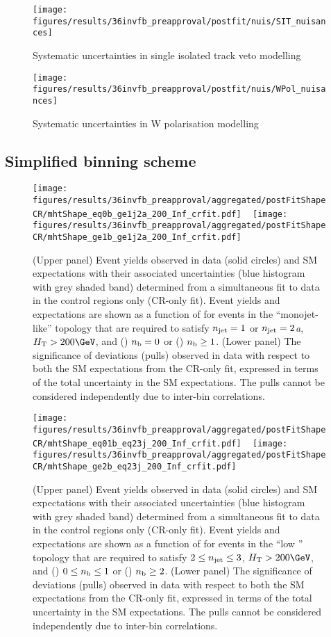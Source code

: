 \clearpage
\begin{figure}[h!]
  \centering
  \caption{Systematic uncertainties in single isolated track veto modelling}
  \texttt{[image: figures/results/36invfb\_preapproval/postfit/nuis/SIT\_nuisances]}
\end{figure}

\clearpage
\begin{figure}[h!]
  \centering
  \caption{Systematic uncertainties in W polarisation modelling}
  \texttt{[image: figures/results/36invfb\_preapproval/postfit/nuis/WPol\_nuisances]}
\end{figure}

\clearpage
\subsection{Simplified binning scheme}
\label{app:aggregated}

\newcommand{\customcaption}[5]{(Upper panel) Event yields observed in
  data (solid circles) and SM expectations with their associated
  uncertainties (blue histogram with grey shaded band) determined from
  a simultaneous fit to data in the control regions only (CR-only
  fit). Event yields and expectations are shown as a function of
  \HTmiss for events in the #1 topology that are required to satisfy
  #2, #3, and (\cmsLeft) #4 or (\cmsRight) #5. 
  (Lower panel) The significance of deviations (pulls) observed in
  data with respect to both the SM expectations from the CR-only fit,
  expressed in terms of the total uncertainty in the SM
  expectations. The pulls cannot be considered independently due to
  inter-bin correlations.}

\begin{figure}[h!]
  \centering
  \caption{
    \customcaption{``monojet-like''}{$n_{\text{jet}} = 1$ or $n_{\text{jet}} = 2${\it a}}{$\scalht > 200\GeV$}{$n_{\text{b}} = 0$}{$n_{\text{b}} \geq 1$}
  }
  \texttt{[image: figures/results/36invfb\_preapproval/aggregated/postFitShapeCR/mhtShape\_eq0b\_ge1j2a\_200\_Inf\_crfit.pdf]} ~
  \texttt{[image: figures/results/36invfb\_preapproval/aggregated/postFitShapeCR/mhtShape\_ge1b\_ge1j2a\_200\_Inf\_crfit.pdf]} 
  \label{fig:aggregated_results1}
\end{figure}

\begin{figure}[h!]
  \centering
  \caption{
    \customcaption{``low \njet''}{$2 \leq n_{\text{jet}} \leq 3$}{$\scalht > 200\GeV$}{$0 \leq n_{\text{b}} \leq 1$}{$n_{\text{b}} \geq 2$}
  }
  \texttt{[image: figures/results/36invfb\_preapproval/aggregated/postFitShapeCR/mhtShape\_eq01b\_eq23j\_200\_Inf\_crfit.pdf]} ~
  \texttt{[image: figures/results/36invfb\_preapproval/aggregated/postFitShapeCR/mhtShape\_ge2b\_eq23j\_200\_Inf\_crfit.pdf]} 
  \label{fig:aggregated_results2}
\end{figure}


